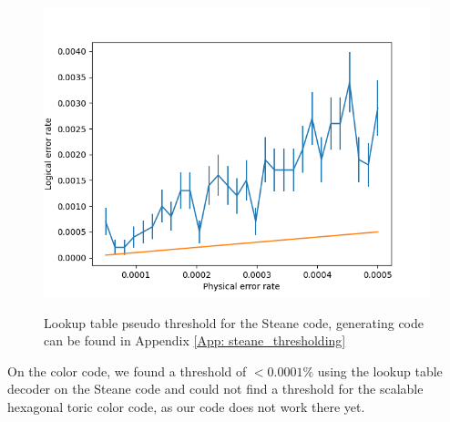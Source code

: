 \begin{figure}[h!]
	\begin{center}
	\captionsetup{justification=centering,margin=2cm}
	\includegraphics[scale=0.4]{./img/figures/thresholds/steaneLookupThreshold.png}\\
	\caption{Lookup table pseudo threshold for the Steane code, generating code can be found in Appendix
    \ref{App: steane_thresholding}}
        
	\label{fig: steane_threshold}
	\end{center}
\end{figure}

\newpage

On the color code, we found a threshold of $<0.0001\%$ using the 
lookup table decoder on the Steane code and could not find a threshold
for the scalable hexagonal toric color code, as our code does not work there yet.

\newpage